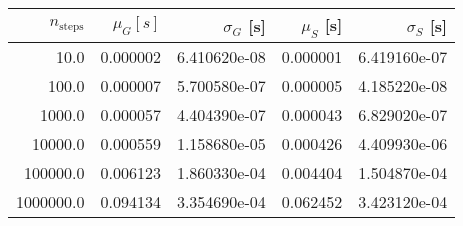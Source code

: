 \begin{tabular}{r|r|r|r|r}
\toprule
 $n_{\mathrm{steps}}$ &  $\mu_{G} [s]$ &  $\sigma_{G}$ [s] &  $\mu_{S}$ [s] &  $\sigma_{S}$ [s] \\
\midrule
                 10.0 &       0.000002 &      6.410620e-08 &       0.000001 &      6.419160e-07 \\
                100.0 &       0.000007 &      5.700580e-07 &       0.000005 &      4.185220e-08 \\
               1000.0 &       0.000057 &      4.404390e-07 &       0.000043 &      6.829020e-07 \\
              10000.0 &       0.000559 &      1.158680e-05 &       0.000426 &      4.409930e-06 \\
             100000.0 &       0.006123 &      1.860330e-04 &       0.004404 &      1.504870e-04 \\
            1000000.0 &       0.094134 &      3.354690e-04 &       0.062452 &      3.423120e-04 \\
\bottomrule
\end{tabular}
